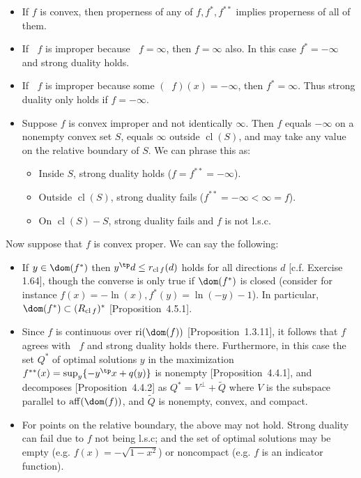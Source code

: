 \documentclass{article}
\DeclareMathOperator{\cl}{cl}
\DeclareMathOperator{\aff}{aff}
\DeclareMathOperator{\relint}{ri}
\DeclareMathOperator{\cvxcl}{\breve{cl}}
\begin{document}
\begin{itemize}
\item If $f$ is convex, then properness of any of $f, f^*, f^{**}$ implies properness of all of them.
\item If $\cvxcl f$ is improper because $\cvxcl f = \infty$, then $f = \infty$ also.  In this case $f^* = -\infty$ and strong duality holds.
\item If $\cvxcl f$ is improper because some $(\cvxcl f)(x) = -\infty$, then $f^* = \infty$.  Thus strong duality only holds if $f = -\infty$.
\item Suppose $f$ is convex improper and not identically $\infty$.  Then $f$ equals $-\infty$ on a nonempty convex set $S$, equals $\infty$ outside $\cl(S)$, and may take any value on the relative boundary of $S$.  We can phrase this as:
  \begin{itemize}
  \item Inside $S$, strong duality holds ($f = f^{**} = -\infty$).
  \item Outside $\cl(S)$, strong duality fails ($f^{**} = -\infty < \infty = f$).
  \item On $\cl(S) - S$, strong duality fails and $f$ is not l.s.c.
  \end{itemize}
\end{itemize}

Now suppose that $f$ is convex proper.  We can say the following:
\begin{itemize}
\item If $y \in \dom(f^*)$ then $y^\tp d \le r_{\cl f}(d)$ holds for all directions $d$
  [c.f. Exercise 1.64], though the converse is only true if $\dom(f^*)$ is closed (consider for instance $f(x) = -\ln(x), f^*(y) = \ln(-y) - 1$).
  In particular, $\dom(f^*) \subset (R_{\cl f})^*$ [Proposition~4.5.1].
\item Since $f$ is continuous over $\relint(\dom(f))$ [Proposition~1.3.11], it follows that $f$ agrees with $\cvxcl f$ and strong duality holds there.
  Furthermore, in this case the set $Q^*$ of optimal solutions $y$ in the maximization $f^{**}(x) = \sup_y\{-y^\tp x + q(y)\}$ is nonempty [Proposition~4.4.1],
  and decomposes [Proposition~4.4.2] as $Q^* = V^\bot + \tilde Q$
  where $V$ is the subspace parallel to $\aff(\dom(f))$,
  and $\tilde Q$ is nonempty, convex, and compact.
\item For points on the relative boundary, the above may not hold.  Strong duality can fail due to $f$ not being l.s.c; and the set of optimal solutions may be empty (e.g. $f(x) = -\sqrt{1 - x^2}$) or noncompact (e.g. $f$ is an indicator function).
\end{itemize}
\end{document}
